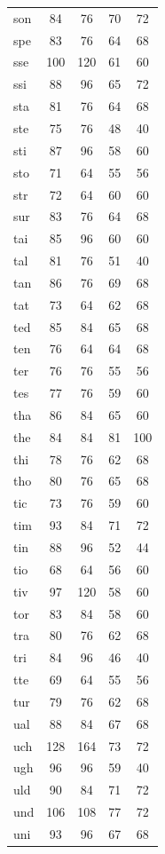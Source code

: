 \documentclass[ms,electronic,twosidetoc,letterpaper,chaptercenter,parttop,lof,lot]{byumsphd}
\begin{document}
\begin{table}
\begin{tabular}{| l | c c | c c |}
  son & 84 & 76 & 70 & 72 \\
  spe & 83 & 76 & 64 & 68 \\
  sse & 100 & 120 & 61 & 60 \\
  ssi & 88 & 96 & 65 & 72 \\
  sta & 81 & 76 & 64 & 68 \\
  ste & 75 & 76 & 48 & 40 \\
  sti & 87 & 96 & 58 & 60 \\
  sto & 71 & 64 & 55 & 56 \\
  str & 72 & 64 & 60 & 60 \\
  sur & 83 & 76 & 64 & 68 \\
  tai & 85 & 96 & 60 & 60 \\
  tal & 81 & 76 & 51 & 40 \\
  tan & 86 & 76 & 69 & 68 \\
  tat & 73 & 64 & 62 & 68 \\
  ted & 85 & 84 & 65 & 68 \\
  ten & 76 & 64 & 64 & 68 \\
  ter & 76 & 76 & 55 & 56 \\
  tes & 77 & 76 & 59 & 60 \\
  tha & 86 & 84 & 65 & 60 \\
  the & 84 & 84 & 81 & 100 \\
  thi & 78 & 76 & 62 & 68 \\
  tho & 80 & 76 & 65 & 68 \\
  tic & 73 & 76 & 59 & 60 \\
  tim & 93 & 84 & 71 & 72 \\
  tin & 88 & 96 & 52 & 44 \\
  tio & 68 & 64 & 56 & 60 \\
  tiv & 97 & 120 & 58 & 60 \\
  tor & 83 & 84 & 58 & 60 \\
  tra & 80 & 76 & 62 & 68 \\
  tri & 84 & 96 & 46 & 40 \\
  tte & 69 & 64 & 55 & 56 \\
  tur & 79 & 76 & 62 & 68 \\
  ual & 88 & 84 & 67 & 68 \\
  uch & 128 & 164 & 73 & 72 \\
  ugh & 96 & 96 & 59 & 40 \\
  uld & 90 & 84 & 71 & 72 \\
  und & 106 & 108 & 77 & 72 \\
  uni & 93 & 96 & 67 & 68 \\

\end{tabular}
\end{table}
\end{document}
